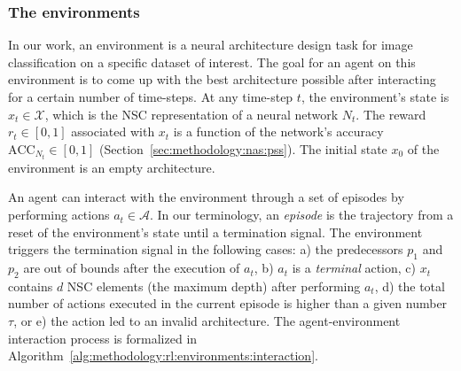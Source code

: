 \subsubsection{The environments}\label{sec:methodology:rl:environments}

In our work, an environment is a neural architecture design task for image classification on a specific dataset of interest. The goal for an agent on this environment is to come up with the best architecture possible after interacting for a certain number of time-steps. At any time-step $t$, the environment's state is $x_t \in \mathcal{X}$, which is the NSC representation of a neural network $N_t$. The reward $r_t \in [0, 1]$ associated with $x_t$ is a function of the network's accuracy $\text{ACC}_{N_t} \in [0, 1]$ (Section~\ref{sec:methodology:nas:pss}). The initial state $x_0$ of the environment is an empty architecture. 

An agent can interact with the environment through a set of episodes by performing actions $a_t \in \mathcal{A}$. In our terminology, an \textit{episode} is the trajectory from a reset of the environment's state until a termination signal. The environment triggers the termination signal in the following cases: a) the predecessors $p_1$ and $p_2$ are out of bounds after the execution of $a_t$, b) $a_t$ is a \textit{terminal} action, c) $x_t$ contains $d$ NSC elements (the maximum depth) after performing $a_t$, d) the total number of actions executed in the current episode is higher than a given number $\tau$, or e) the action led to an invalid architecture. The agent-environment interaction process is formalized in Algorithm~\ref{alg:methodology:rl:environments:interaction}.

